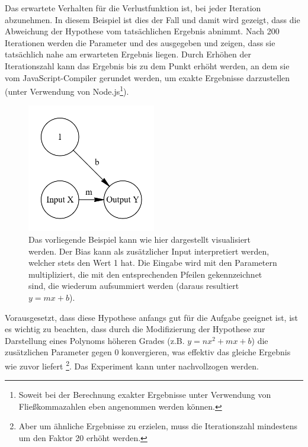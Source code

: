 Das erwartete Verhalten für die Verlustfunktion ist, bei jeder Iteration abzunehmen.
In diesem Beispiel ist dies der Fall und damit wird gezeigt, dass die Abweichung der Hypothese vom tatsächlichen Ergebnis abnimmt.
Nach 200 Iterationen werden die Parameter  und  des  ausgegeben und zeigen, dass sie tatsächlich nahe am erwarteten Ergebnis liegen.
Durch Erhöhen der Iterationszahl kann das Ergebnis bis zu dem Punkt erhöht werden, an dem sie vom JavaScript-Compiler gerundet werden, um exakte Ergebnisse darzustellen (unter Verwendung von Node.js\footnote{ Soweit bei der Berechnung exakter Ergebnisse unter Verwendung von Fließkommazahlen eben angenommen werden können.}).

\begin{figure}
    \centering
    \caption[Das einfachste Modell]{Das vorliegende Beispiel kann wie hier dargestellt visualisiert werden. Der Bias kann als zusätzlicher Input interpretiert werden, welcher stets den Wert 1 hat. Die Eingabe wird mit den Parametern multipliziert, die mit den entsprechenden Pfeilen gekennzeichnet sind, die wiederum aufsummiert werden (daraus resultiert $y = mx + b$).}
    \includegraphics[width=0.5\textwidth]{images/1_simplest_nn.png}
\end{figure}

Vorausgesetzt, dass diese Hypothese anfangs gut für die Aufgabe geeignet ist, ist es wichtig zu beachten, dass durch die Modifizierung der Hypothese zur Darstellung eines Polynoms höheren Grades (z.B. $y = nx^2 + mx + b$) die zusätzlichen Parameter gegen 0 konvergieren, was effektiv das gleiche Ergebnis wie zuvor liefert \footnote{Aber um ähnliche Ergebnisse zu erzielen, muss die Iterationszahl mindestens um den Faktor 20 erhöht werden.}.
Das Experiment kann unter  nachvollzogen werden.
